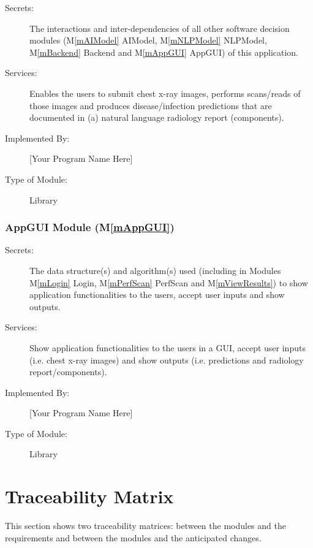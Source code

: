 \documentclass[12pt, titlepage]{article}
\newcommand{\mref}[1]{M\ref{#1}}
\begin{document}
\begin{description}
\item[Secrets:] The interactions and inter-dependencies of all other software
  decision modules (\mref{mAIModel} AIModel, \mref{mNLPModel} NLPModel,
  \mref{mBackend} Backend and \mref{mAppGUI} AppGUI) of this application.
\item[Services:] Enables the users to submit chest x-ray images, performs
  scans/reads of those images and produces disease/infection predictions that
  are documented in (a) natural language radiology report (components).
\item[Implemented By:] [Your Program Name Here]
\item[Type of Module:] Library
\end{description}

\subsubsection{AppGUI Module (\mref{mAppGUI})}

\begin{description}
\item[Secrets:] The data structure(s) and algorithm(s) used (including in
  Modules \mref{mLogin} Login, \mref{mPerfScan} PerfScan and
  \mref{mViewResults}) to show application functionalities to the users,
  accept user inputs and show outputs.
\item[Services:] Show application functionalities to the users in a
  GUI, accept user inputs (i.e. chest x-ray images) and show outputs (i.e.
  predictions and radiology report/components).
\item[Implemented By:] [Your Program Name Here]
\item[Type of Module:] Library
\end{description}

\section{Traceability Matrix} \label{SecTM}

This section shows two traceability matrices: between the modules and the
requirements and between the modules and the anticipated changes.
\end{document}
